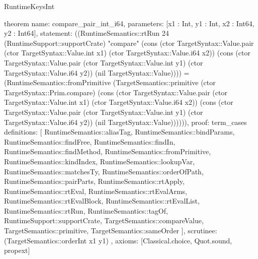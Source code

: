 \begin{lexlean}{RuntimeKeysInt}
\begin{semanticmodule}
theorem{
  name: compare_pair_int_i64,
  parameters: [x1 : Int, y1 : Int, x2 : Int64, y2 : Int64],
  statement: ((RuntimeSemantics::rtRun 24 (RuntimeSupport::supportCrate) "compare" (cons (ctor TargetSyntax::Value.pair (ctor TargetSyntax::Value.int x1) (ctor TargetSyntax::Value.i64 x2)) (cons (ctor TargetSyntax::Value.pair (ctor TargetSyntax::Value.int y1) (ctor TargetSyntax::Value.i64 y2)) (nil TargetSyntax::Value)))) = (RuntimeSemantics::fromPrimitive (TargetSemantics::primitive (ctor TargetSyntax::Prim.compare) (cons (ctor TargetSyntax::Value.pair (ctor TargetSyntax::Value.int x1) (ctor TargetSyntax::Value.i64 x2)) (cons (ctor TargetSyntax::Value.pair (ctor TargetSyntax::Value.int y1) (ctor TargetSyntax::Value.i64 y2)) (nil TargetSyntax::Value)))))),
  proof: term_cases{
    definitions: [
      RuntimeSemantics::aliasTag,
      RuntimeSemantics::bindParams,
      RuntimeSemantics::findFree,
      RuntimeSemantics::findIn,
      RuntimeSemantics::findMethod,
      RuntimeSemantics::fromPrimitive,
      RuntimeSemantics::kindIndex,
      RuntimeSemantics::lookupVar,
      RuntimeSemantics::matchesTy,
      RuntimeSemantics::orderOfPath,
      RuntimeSemantics::pairParts,
      RuntimeSemantics::rtApply,
      RuntimeSemantics::rtEval,
      RuntimeSemantics::rtEvalArms,
      RuntimeSemantics::rtEvalBlock,
      RuntimeSemantics::rtEvalList,
      RuntimeSemantics::rtRun,
      RuntimeSemantics::tagOf,
      RuntimeSupport::supportCrate,
      TargetSemantics::compareValue,
      TargetSemantics::primitive,
      TargetSemantics::sameOrder
    ],
    scrutinee: (TargetSemantics::orderInt x1 y1)
  },
  axioms: [Classical.choice, Quot.sound, propext]
}
\end{semanticmodule}
\end{lexlean}

